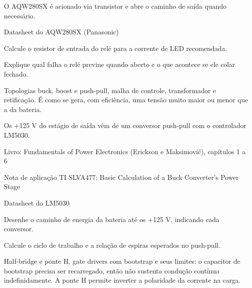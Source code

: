 \begin{noproduto}
O AQW280SX é acionado via transistor e abre o caminho de saída quando necessário.
\end{noproduto}

\begin{paraestudar}
  \item Datasheet do AQW280SX (Panasonic)
\end{paraestudar}

\begin{pratique}
  \item Calcule o resistor de entrada do relé para a corrente de LED recomendada.
  \item Explique qual falha o relé previne quando aberto e o que acontece se ele colar fechado.
\end{pratique}


Topologias buck, boost e push-pull, malha de controle, transformador e retificação. É como se gera, com eficiência, uma tensão muito maior ou menor que a da bateria.

\begin{noproduto}
Os +125 V do estágio de saída vêm de um conversor push-pull com o controlador LM5030.
\end{noproduto}

\begin{paraestudar}
  \item Livro: Fundamentals of Power Electronics (Erickson e Maksimović), capítulos 1 a 6
  \item Nota de aplicação TI SLVA477: Basic Calculation of a Buck Converter's Power Stage
  \item Datasheet do LM5030
\end{paraestudar}

\begin{pratique}
  \item Desenhe o caminho de energia da bateria até os +125 V, indicando cada conversor.
  \item Calcule o ciclo de trabalho e a relação de espiras esperados no push-pull.
\end{pratique}

Half-bridge e ponte H, gate drivers com bootstrap e seus limites: o capacitor de bootstrap precisa ser recarregado, então não sustenta condução contínua indefinidamente. A ponte H permite inverter a polaridade da corrente na carga.

